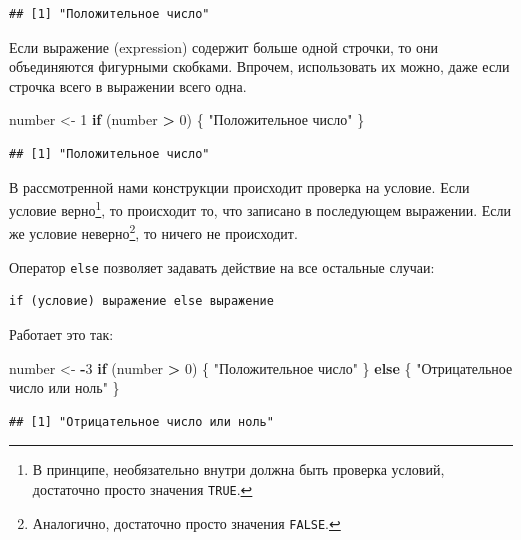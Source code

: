 \documentclass[]{book}
\newenvironment{Shaded}{\begin{snugshade}}{\end{snugshade}}
\newcommand{\DecValTok}[1]{\textcolor[rgb]{0.00,0.00,0.81}{#1}}
\newcommand{\StringTok}[1]{\textcolor[rgb]{0.31,0.60,0.02}{#1}}
\newcommand{\ControlFlowTok}[1]{\textcolor[rgb]{0.13,0.29,0.53}{\textbf{#1}}}
\newcommand{\OperatorTok}[1]{\textcolor[rgb]{0.81,0.36,0.00}{\textbf{#1}}}
\newcommand{\NormalTok}[1]{#1}
\begin{document}
\begin{verbatim}
## [1] "Положительное число"
\end{verbatim}

Если выражение (expression) содержит больше одной строчки, то они
объединяются фигурными скобками. Впрочем, использовать их можно, даже
если строчка всего в выражении всего одна.

\begin{Shaded}
\begin{Highlighting}[]
\NormalTok{number <-}\StringTok{ }\DecValTok{1}
\ControlFlowTok{if}\NormalTok{ (number }\OperatorTok{>}\StringTok{ }\DecValTok{0}\NormalTok{) \{}
  \StringTok{"Положительное число"}
\NormalTok{\}}
\end{Highlighting}
\end{Shaded}

\begin{verbatim}
## [1] "Положительное число"
\end{verbatim}

В рассмотренной нами конструкции происходит проверка на условие. Если
условие верно\footnote{В принципе, необязательно внутри должна быть
  проверка условий, достаточно просто значения \texttt{TRUE}.}, то
происходит то, что записано в последующем выражении. Если же условие
неверно\footnote{Аналогично, достаточно просто значения \texttt{FALSE}.},
то ничего не происходит.

Оператор \texttt{else} позволяет задавать действие на все остальные
случаи:

\begin{verbatim}
if (условие) выражение else выражение
\end{verbatim}

Работает это так:

\begin{Shaded}
\begin{Highlighting}[]
\NormalTok{number <-}\StringTok{ }\OperatorTok{-}\DecValTok{3}
\ControlFlowTok{if}\NormalTok{ (number }\OperatorTok{>}\StringTok{ }\DecValTok{0}\NormalTok{) \{}
  \StringTok{"Положительное число"}
\NormalTok{\} }\ControlFlowTok{else}\NormalTok{ \{}
  \StringTok{"Отрицательное число или ноль"}
\NormalTok{\}}
\end{Highlighting}
\end{Shaded}

\begin{verbatim}
## [1] "Отрицательное число или ноль"
\end{verbatim}
\end{document}
